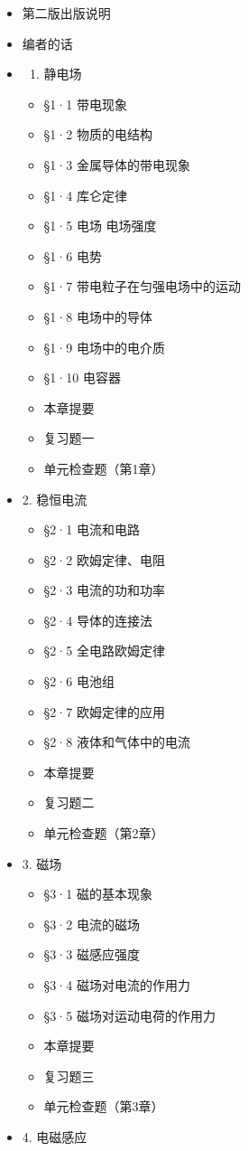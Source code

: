 \begin{itemize}
\item
  第二版出版说明
\item
  编者的话
\item
  \begin{enumerate}
  \def\labelenumi{\arabic{enumi}.}
  \tightlist
  \item
    静电场
  \end{enumerate}

  \begin{itemize}
  \tightlist
  \item
    §1·1 带电现象
  \item
    §1·2 物质的电结构
  \item
    §1·3 金属导体的带电现象
  \item
    §1·4 库仑定律
  \item
    §1·5 电场 电场强度
  \item
    §1·6 电势
  \item
    §1·7 带电粒子在匀强电场中的运动
  \item
    §1·8 电场中的导体
  \item
    §1·9 电场中的电介质
  \item
    §1·10 电容器
  \item
    本章提要
  \item
    复习题一
  \item
    单元检查题（第1章）
  \end{itemize}
\item
  2. 稳恒电流

  \begin{itemize}
  \tightlist
  \item
    §2·1 电流和电路
  \item
    §2·2 欧姆定律、电阻
  \item
    §2·3 电流的功和功率
  \item
    §2·4 导体的连接法
  \item
    §2·5 全电路欧姆定律
  \item
    §2·6 电池组
  \item
    §2·7 欧姆定律的应用
  \item
    §2·8 液体和气体中的电流
  \item
    本章提要
  \item
    复习题二
  \item
    单元检查题（第2章）
  \end{itemize}
\item
  3. 磁场

  \begin{itemize}
  \tightlist
  \item
    §3·1 磁的基本现象
  \item
    §3·2 电流的磁场
  \item
    §3·3 磁感应强度
  \item
    §3·4 磁场对电流的作用力
  \item
    §3·5 磁场对运动电荷的作用力
  \item
    本章提要
  \item
    复习题三
  \item
    单元检查题（第3章）
  \end{itemize}
\item
  4. 电磁感应


\end{itemize}
